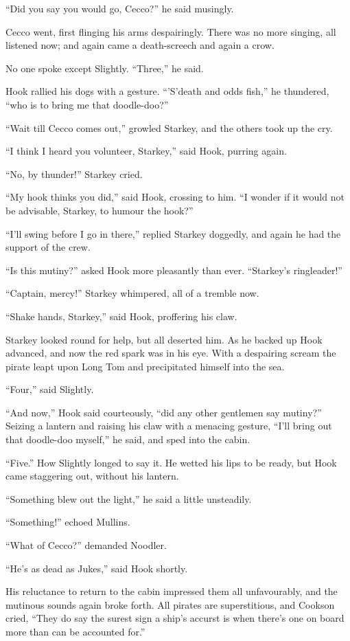 ``Did you say you would go, Cecco?'' he said musingly.

Cecco went, first flinging his arms despairingly. There was no more
singing, all listened now; and again came a death-screech and again a
crow.

No one spoke except Slightly. ``Three,'' he said.

Hook rallied his dogs with a gesture. ``'S'death and odds fish,'' he
thundered, ``who is to bring me that doodle-doo?''

``Wait till Cecco comes out,'' growled Starkey, and the others took up
the cry.

``I think I heard you volunteer, Starkey,'' said Hook, purring again.

``No, by thunder!'' Starkey cried.

``My hook thinks you did,'' said Hook, crossing to him. ``I wonder if it
would not be advisable, Starkey, to humour the hook?''

``I'll swing before I go in there,'' replied Starkey doggedly, and again
he had the support of the crew.

``Is this mutiny?'' asked Hook more pleasantly than ever. ``Starkey's
ringleader!''

``Captain, mercy!'' Starkey whimpered, all of a tremble now.

``Shake hands, Starkey,'' said Hook, proffering his claw.

Starkey looked round for help, but all deserted him. As he backed up
Hook advanced, and now the red spark was in his eye. With a despairing
scream the pirate leapt upon Long Tom and precipitated himself into the
sea.

``Four,'' said Slightly.

``And now,'' Hook said courteously, ``did any other gentlemen say mutiny?''
Seizing a lantern and raising his claw with a menacing gesture, ``I'll
bring out that doodle-doo myself,'' he said, and sped into the cabin.

``Five.'' How Slightly longed to say it. He wetted his lips to be ready,
but Hook came staggering out, without his lantern.

``Something blew out the light,'' he said a little unsteadily.

``Something!'' echoed Mullins.

``What of Cecco?'' demanded Noodler.

``He's as dead as Jukes,'' said Hook shortly.

His reluctance to return to the cabin impressed them all unfavourably,
and the mutinous sounds again broke forth. All pirates are
superstitious, and Cookson cried, ``They do say the surest sign a ship's
accurst is when there's one on board more than can be accounted for.''


